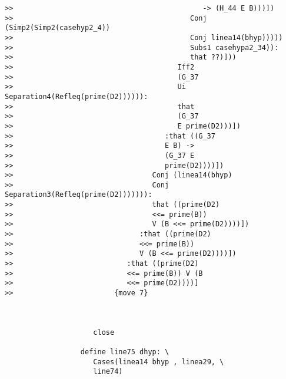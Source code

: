 \documentclass[12pt]{article}
\begin{document}
\begin{verbatim}
>>                                             -> (H_44 E B)))])
>>                                          Conj (Simp2(Simp2(casehyp2_4))
>>                                          Conj linea14(bhyp)))))
>>                                          Subs1 casehypa2_34)):
>>                                          that ??)]))
>>                                       Iff2
>>                                       (G_37
>>                                       Ui Separation4(Refleq(prime(D2)))))):
>>                                       that
>>                                       (G_37
>>                                       E prime(D2)))])
>>                                    :that ((G_37
>>                                    E B) ->
>>                                    (G_37 E
>>                                    prime(D2))))])
>>                                 Conj (linea14(bhyp)
>>                                 Conj Separation3(Refleq(prime(D2))))))):
>>                                 that ((prime(D2)
>>                                 <<= prime(B))
>>                                 V (B <<= prime(D2))))])
>>                              :that ((prime(D2)
>>                              <<= prime(B))
>>                              V (B <<= prime(D2))))])
>>                           :that ((prime(D2)
>>                           <<= prime(B)) V (B
>>                           <<= prime(D2))))]
>>                        {move 7}



                     close

                  define line75 dhyp: \
                     Cases(linea14 bhyp , linea29, \
                     line74)


\end{verbatim}
\end{document}
